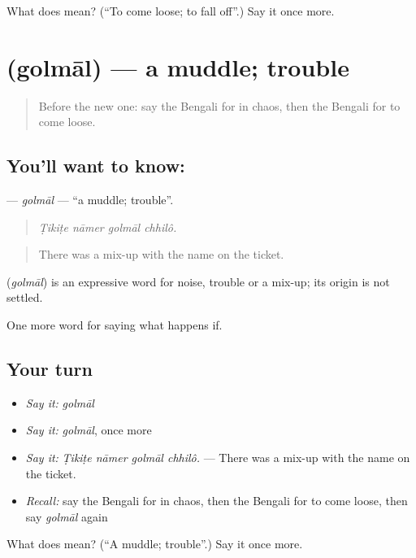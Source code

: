 \begin{tcolorbox}[breakable,colback=teal!4,colframe=teal!35!black,title={Before you move on}]
What does  mean? (\textquotedblleft{}To come loose; to fall off\textquotedblright{}.) Say it once more.
\end{tcolorbox}
\section[\texorpdfstring{\bn{গোলমাল} (golmāl)}{গোলমাল (golmāl)}]{ (golmāl) — a muddle; trouble}

\label{lesson:BN-C542-golmal}



\begin{quote}
Before the new one: say the Bengali for in chaos, then the Bengali for to come loose.
\end{quote}

\subsection*{You'll want to know: }
\textbf{} — \emph{golmāl} — \textquotedblleft{}a muddle; trouble\textquotedblright{}.

\begin{quote}
   
\end{quote}

\begin{quote}
\emph{Ṭikiṭe nāmer golmāl chhilô.}
\end{quote}

\begin{quote}
There was a mix-up with the name on the ticket.
\end{quote}

\begin{cousinweb}
\textbf{} (\emph{golmāl}) is an expressive word for noise, trouble or a mix-up; its origin is not settled.
\end{cousinweb}

\begin{grammarlens}[title={What you've built}]
One more word for saying what happens if.
\end{grammarlens}

\subsection*{Your turn}
\begin{itemize}
\raggedright
  \item \emph{Say it:} \emph{golmāl}
  \item \emph{Say it:} \emph{golmāl}, once more
  \item \emph{Say it:} \emph{Ṭikiṭe nāmer golmāl chhilô.} — There was a mix-up with the name on the ticket.
  \item \emph{Recall:} say the Bengali for in chaos, then the Bengali for to come loose, then say \emph{golmāl} again
\end{itemize}

\begin{tcolorbox}[breakable,colback=teal!4,colframe=teal!35!black,title={Before you move on}]
What does  mean? (\textquotedblleft{}A muddle; trouble\textquotedblright{}.) Say it once more.
\end{tcolorbox}

